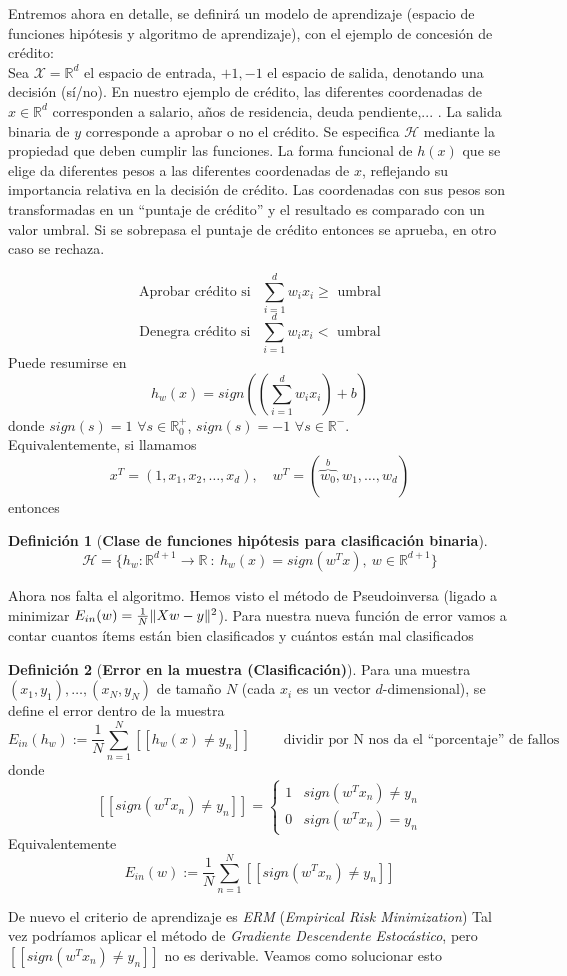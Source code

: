 \documentclass[11pt,a4paper]{article}
\DeclarePairedDelimiter{\norm}{\lVert}{\rVert}
\theoremstyle{definition}
\newtheorem{definition}{Definición}[section]
\newcommand{\R}{\mathbb{R}}
\begin{document}
	Entremos ahora en detalle, se definirá un modelo de aprendizaje (espacio de funciones hipótesis y algoritmo de aprendizaje), con el ejemplo de concesión de crédito:\\
	Sea $\mathcal{X}=\R^d$ el espacio de entrada, $\mathcal{+1,-1}$ el espacio de salida, denotando una decisión (sí/no). En nuestro ejemplo de crédito, las diferentes coordenadas de $x\in \R^d$ corresponden a salario, años de residencia, deuda pendiente,... . La salida binaria de $y$ corresponde a aprobar o no el crédito. Se especifica $\mathcal{H}$ mediante la propiedad que deben cumplir las funciones. La forma funcional de $h(x)$ que se elige da diferentes pesos a las diferentes coordenadas de $x$, reflejando su importancia relativa en la decisión de crédito. Las coordenadas con sus pesos son transformadas en un ``puntaje de crédito'' y el resultado es comparado con un valor umbral. Si se sobrepasa el puntaje de crédito entonces se aprueba, en otro caso se rechaza.
	
	$$\text{Aprobar crédito si } \ \ \sum_{i=1}^d w_i x_i \geq \text{ umbral}$$
	$$\text{Denegra crédito si } \ \ \sum_{i=1}^d w_i x_i < \text{ umbral}$$
	Puede resumirse en 
	$$h_w(x)=sign \left( \left( \sum_{i=1}^d w_i x_i\right) + b \right)$$
	donde $sign(s)=1$ $\forall s\in \R_0^+$, $sign(s)=-1$ $\forall s \in \R^-$. \\
	Equivalentemente, si llamamos $$x^T=(1,x_1,x_2,\ldots ,x_d),\quad w^T=(\overbrace{w_0}^b, w_1,\ldots , w_d)$$	
	entonces
	\begin{definition}[\bf Clase de funciones hipótesis para clasificación binaria]
	$$\mathcal{H}=\{h_w\colon \R^{d+1} \to \R \ : \ h_w(x) = sign(w^Tx), \ w \in \R^{d+1}\}$$
	\end{definition}
	Ahora nos falta el algoritmo. Hemos visto el método de Pseudoinversa (ligado a minimizar $E_{in}(w)=\frac{1}{N}\norm{Xw-y}^2$). Para nuestra nueva función de error vamos a contar cuantos ítems están bien clasificados y cuántos están mal clasificados
	\begin{definition}[\bf Error en la muestra (Clasificación)]
	Para una muestra $(x_1,y_1),\ldots ,(x_N, y_N)$ de tamaño $N$ (cada $x_i$ es un vector $d$-dimensional), se define el error dentro de la muestra
	$$E_{in}(h_w):= \frac{1}{N} \sum_{n=1}^N [[h_w(x)\neq y_n]] \quad \quad \text{ dividir por N nos da el ``porcentaje'' de fallos}$$
	donde 
	$$[[sign(w^T x_n) \neq y_n]] = \begin{cases}
	1 & sign(w^T x_n)\neq y_n\\
	0 & sign(w^T x_n) = y_n
	\end{cases}
	$$
	Equivalentemente
	$$E_{in}(w):= \frac{1}{N} \sum_{n=1}^N [[sign(w^Tx_n)\neq y_n]]$$
	
	\end{definition}
	De nuevo el criterio de aprendizaje es \textit{ERM} (\textit{Empirical Risk Minimization})
	Tal vez podríamos aplicar el método de \textit{Gradiente Descendente Estocástico}, pero $[[sign(w^T x_n) \neq y_n]]$ no es derivable. Veamos como solucionar esto
	
\end{document}
